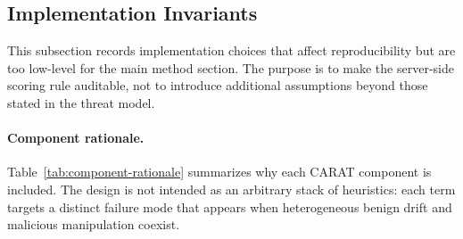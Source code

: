 \documentclass{article}
\begin{document}
\subsection{Implementation Invariants}
\label{sec:appendix-implementation}

This subsection records implementation choices that affect reproducibility but are too low-level for the main method section. The purpose is to make the server-side scoring rule auditable, not to introduce additional assumptions beyond those stated in the threat model.

\paragraph{Component rationale.}
\label{sec:appendix-component-rationale}
Table~\ref{tab:component-rationale} summarizes why each CARAT component is included. The design is not intended as an arbitrary stack of heuristics: each term targets a distinct failure mode that appears when heterogeneous benign drift and malicious manipulation coexist.
\end{document}
